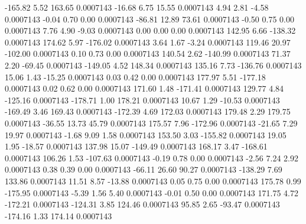      -165.82        5.52      163.65     0.0007143
      -16.68        6.75       15.55     0.0007143
        4.94        2.81       -4.58     0.0007143
       -0.04        0.70        0.00     0.0007143
      -86.81       12.89       73.61     0.0007143
       -0.50        0.75        0.00     0.0007143
        7.76        4.90       -9.03     0.0007143
        0.00        0.00        0.00     0.0007143
      142.95        6.66     -138.32     0.0007143
      174.62        5.97     -176.02     0.0007143
        3.64        1.67       -3.24     0.0007143
      119.46       20.97     -102.00     0.0007143
        0.10        0.73        0.00     0.0007143
      140.54        2.62     -140.99     0.0007143
       71.37        2.20      -69.45     0.0007143
     -149.05        4.52      148.34     0.0007143
      135.16        7.73     -136.76     0.0007143
       15.06        1.43      -15.25     0.0007143
        0.03        0.42        0.00     0.0007143
      177.97        5.51     -177.18     0.0007143
        0.02        0.62        0.00     0.0007143
      171.60        1.48     -171.41     0.0007143
      129.77        4.84     -125.16     0.0007143
     -178.71        1.00      178.21     0.0007143
       10.67        1.29      -10.53     0.0007143
     -169.49        3.46      169.43     0.0007143
     -172.39        4.69      172.03     0.0007143
      179.48        2.29      179.75     0.0007143
      -36.55       13.73       45.79     0.0007143
      175.57        7.96     -172.96     0.0007143
      -21.65        7.29       19.97     0.0007143
       -1.68        9.09        1.58     0.0007143
      153.50        3.03     -155.82     0.0007143
       19.05        1.95      -18.57     0.0007143
      137.98       15.07     -149.49     0.0007143
      168.17        3.47     -168.61     0.0007143
      106.26        1.53     -107.63     0.0007143
       -0.19        0.78        0.00     0.0007143
       -2.56        7.24        2.92     0.0007143
        0.38        0.39        0.00     0.0007143
      -66.11       26.60       90.27     0.0007143
     -138.29        7.69      133.86     0.0007143
       11.51        8.57      -13.88     0.0007143
        0.05        0.75        0.00     0.0007143
      175.78        0.99     -175.95     0.0007143
       -5.39        1.56        5.40     0.0007143
       -0.01        0.50        0.00     0.0007143
      171.75        4.72     -172.21     0.0007143
     -124.31        3.85      124.46     0.0007143
       95.85        2.65      -93.47     0.0007143
     -174.16        1.33      174.14     0.0007143
